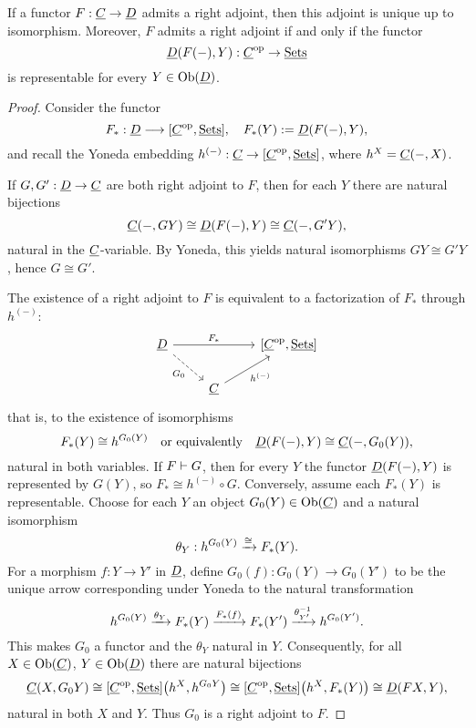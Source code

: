 \begin{proposition*}
	If a functor \( F: \underline{C} \to \underline{D} \) admits a right adjoint, then this adjoint is unique up to isomorphism. Moreover, \( F \) admits a right adjoint if and only if the functor
	\[
		\underline{D}(F(-), Y): \underline{C}^\mathrm{op} \to \underline{\mathrm{Sets}}
	\]
	is representable for every \( Y \in \operatorname{Ob}(\underline{D}) \).
\end{proposition*}

\begin{proof}
	Consider the functor
	\[
		F_*: \underline{D} \longrightarrow [\underline{C}^\mathrm{op}, \underline{\mathrm{Sets}}],
		\quad 
		F_*(Y) := \underline{D}(F(-), Y),
	\]
	and recall the Yoneda embedding \( h^{(-)}: \underline{C} \to [\underline{C}^\mathrm{op}, \underline{\mathrm{Sets}}] \), where \( h^{X} = \underline{C}(-, X) \).


	If \( G, G': \underline{D} \to \underline{C} \) are both right adjoint to \( F \), then for each \( Y \) there are natural bijections
	\[
		\underline{C}(-, GY) \cong \underline{D}(F(-), Y) \cong \underline{C}(-, G'Y),
	\]
	natural in the \( \underline{C} \)-variable. By Yoneda, this yields natural isomorphisms \( GY \cong G'Y \), hence \( G \cong G' \).


	The existence of a right adjoint to \( F \) is equivalent to a factorization of \( F_* \) through \( h^{(-)} \):
	\[
		\begin{tikzcd}
			\ct{D} \arrow[rr, "F_*"] \arrow[dr, dashed, "G_0"'] && {[\C^\op, \ctrm{Sets}]} \\
			& \C \arrow[ur, "h^{(-)}"'] &
		\end{tikzcd}
	\]
	that is, to the existence of isomorphisms
	\[
		F_*(Y) \cong h^{G_0(Y)} \quad \text{or equivalently} \quad
		\underline{D}(F(-), Y) \cong \underline{C}(-, G_0(Y)),
	\]
	natural in both variables. If \( F \mathrel{\vdash} G \), then for every \( Y \) the functor \( \underline{D}(F(-), Y) \) is represented by \( G(Y) \), so \( F_* \cong h^{(-)} \circ G \). Conversely, assume each \( F_*(Y) \) is representable. Choose for each \( Y \) an object \( G_0(Y) \in \operatorname{Ob}(\underline{C}) \) and a natural isomorphism
	\[
		\theta_Y: h^{G_0(Y)} \xrightarrow{ \cong} F_*(Y).
	\]
	For a morphism \( f: Y \to Y' \) in \( \underline{D} \), define \( G_0(f): G_0(Y) \to G_0(Y') \) to be the unique arrow corresponding under Yoneda to the natural transformation
	\[
		h^{G_0(Y)} \xrightarrow{\theta_Y} F_*(Y) \xrightarrow{F_*(f)} F_*(Y') \xrightarrow{\theta_{Y'}^{-1}} h^{G_0(Y')}.
	\]
	This makes \( G_0 \) a functor and the \( \theta_Y \) natural in \( Y \). Consequently, for all \( X \in \operatorname{Ob}(\underline{C}) \), \( Y \in \operatorname{Ob}(\underline{D}) \) there are natural bijections
	\[
		\underline{C}(X, G_0Y)
		\cong [\underline{C}^\mathrm{op}, \underline{\mathrm{Sets}}]\bigl(h^{X}, h^{G_0Y}\bigr)
		\cong [\underline{C}^\mathrm{op}, \underline{\mathrm{Sets}}]\bigl(h^{X}, F_*(Y)\bigr)
		\cong \underline{D}(FX, Y),
	\]
	natural in both \( X \) and \( Y \). Thus \( G_0 \) is a right adjoint to \( F \).
\end{proof}


